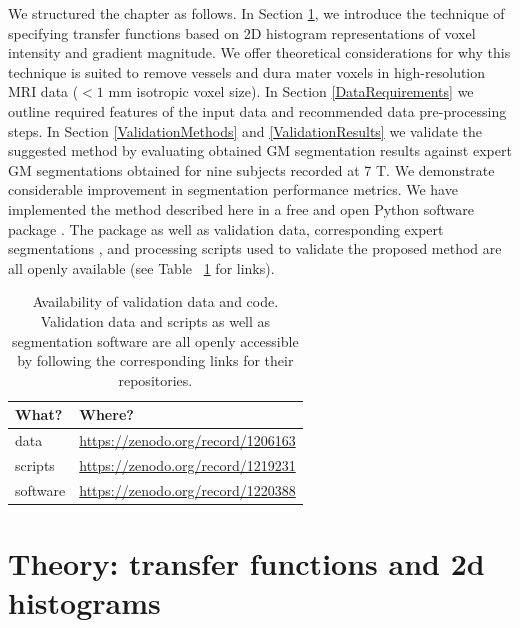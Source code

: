We structured the chapter as follows. In Section \ref{Theory}, we introduce the technique of specifying transfer functions based on 2D histogram representations of voxel intensity and gradient magnitude. We offer theoretical considerations for why this technique is suited to remove vessels and dura mater voxels in high-resolution MRI data ($< 1$ mm isotropic voxel size). In Section \ref{DataRequirements} we outline required features of the input data and recommended data pre-processing steps. In Section \ref{ValidationMethods} and \ref{ValidationResults} we validate the suggested method by evaluating obtained GM segmentation results against expert GM segmentations obtained for nine subjects recorded at 7 T. We demonstrate considerable improvement in segmentation performance metrics. We have implemented the method described here in a free and open Python software package \parencite{segmentator_v1.5.0}. The package as well as validation data, corresponding expert segmentations \parencite{shared_dataset}, and processing scripts \parencite{segmentator_processing_scripts} used to validate the proposed method are all openly available (see Table ~\ref{tab:availability} for links).

\begin{table}[!ht]
\centering
\begin{tabular}{l l}
What? & Where? \\\hline
data & \url{https://zenodo.org/record/1206163}\\
scripts & \url{https://zenodo.org/record/1219231}\\
software & \url{https://zenodo.org/record/1220388}
\end{tabular}
\caption{\label{tab:availability}Availability of validation data and code. Validation data and scripts as well as segmentation software are all openly accessible by following the corresponding links for their repositories.}
\end{table}

\section{Theory: transfer functions and 2d histograms} \label{Theory}

